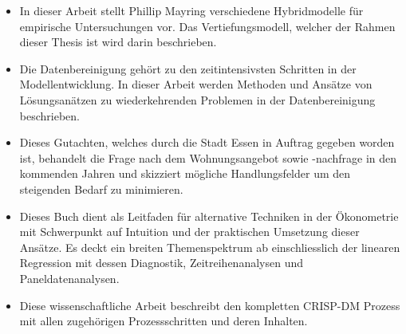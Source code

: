 \begin{itemize}
    \item In dieser Arbeit stellt Phillip Mayring verschiedene Hybridmodelle für empirische
    Untersuchungen vor. Das Vertiefungsmodell, welcher der Rahmen dieser Thesis ist wird
    darin beschrieben.
\end{itemize}

\begin{itemize}
    \item Die Datenbereinigung gehört zu den zeitintensivsten 
    Schritten in der Modellentwicklung. In dieser Arbeit werden Methoden 
    und Ansätze von Lösungsanätzen zu wiederkehrenden Problemen in der 
    Datenbereinigung beschrieben. 
\end{itemize}
\newpage
{}
\begin{itemize}
    \item Dieses Gutachten, welches durch die Stadt Essen in Auftrag gegeben worden ist, 
    behandelt die Frage nach dem Wohnungsangebot sowie -nachfrage in den kommenden Jahren 
    und skizziert mögliche Handlungsfelder um den steigenden Bedarf zu minimieren. 
\end{itemize}

\begin{itemize}
    \item Dieses Buch dient als Leitfaden für alternative Techniken in der Ökonometrie mit 
    Schwerpunkt auf Intuition und der praktischen Umsetzung dieser Ansätze. Es deckt 
    ein breiten Themenspektrum ab einschliesslich der linearen Regression mit dessen 
    Diagnostik, Zeitreihenanalysen und Paneldatenanalysen. 
\end{itemize}

\begin{itemize}
    \item Diese wissenschaftliche Arbeit beschreibt den kompletten CRISP-DM Prozess 
    mit allen zugehörigen Prozessschritten und deren Inhalten. 
\end{itemize}